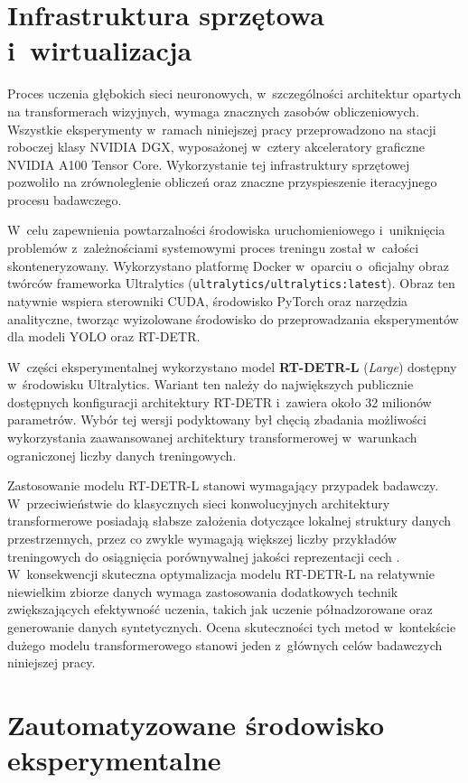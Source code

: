 \section{Infrastruktura sprzętowa i~wirtualizacja}

Proces uczenia głębokich sieci neuronowych, w~szczególności architektur opartych na transformerach wizyjnych, wymaga znacznych zasobów obliczeniowych. Wszystkie eksperymenty w~ramach niniejszej pracy przeprowadzono na stacji roboczej klasy NVIDIA DGX, wyposażonej w~cztery akceleratory graficzne NVIDIA A100 Tensor Core. Wykorzystanie tej infrastruktury sprzętowej pozwoliło na zrównoleglenie obliczeń oraz znaczne przyspieszenie iteracyjnego procesu badawczego.

W~celu zapewnienia powtarzalności środowiska uruchomieniowego i~uniknięcia problemów z~zależnościami systemowymi proces treningu został w~całości skonteneryzowany. Wykorzystano platformę Docker w~oparciu o~oficjalny obraz twórców frameworka Ultralytics (\texttt{ultralytics/ultralytics:latest}). Obraz ten natywnie wspiera sterowniki CUDA, środowisko PyTorch oraz narzędzia analityczne, tworząc wyizolowane środowisko do przeprowadzania eksperymentów dla modeli YOLO oraz RT-DETR.

W~części eksperymentalnej wykorzystano model \textbf{RT-DETR-L} (\emph{Large}) dostępny w~środowisku Ultralytics. Wariant ten należy do największych publicznie dostępnych konfiguracji architektury RT-DETR i~zawiera około 32 milionów parametrów. Wybór tej wersji podyktowany był chęcią zbadania możliwości wykorzystania zaawansowanej architektury transformerowej w~warunkach ograniczonej liczby danych treningowych.

Zastosowanie modelu RT-DETR-L stanowi wymagający przypadek badawczy. W~przeciwieństwie do klasycznych sieci konwolucyjnych architektury transformerowe posiadają słabsze założenia dotyczące lokalnej struktury danych przestrzennych, przez co zwykle wymagają większej liczby przykładów treningowych do osiągnięcia porównywalnej jakości reprezentacji cech \cite{Dosovitskiy2020}. W~konsekwencji skuteczna optymalizacja modelu RT-DETR-L na relatywnie niewielkim zbiorze danych wymaga zastosowania dodatkowych technik zwiększających efektywność uczenia, takich jak uczenie półnadzorowane oraz generowanie danych syntetycznych. Ocena skuteczności tych metod w~kontekście dużego modelu transformerowego stanowi jeden z~głównych celów badawczych niniejszej pracy.

\section{Zautomatyzowane środowisko eksperymentalne}
\label{sec:srodowisko}

